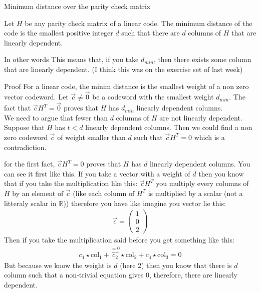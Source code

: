 

\begin{parag}{Minimum distance over the parity check matrix}
	\begin{theoreme}
	     Let $H$ be any parity check matrix of a linear code. The minimum distance of the code is the smallest positive integer $d$ such that there are $d$ columns of $H$ that are linearly dependent.
	\end{theoreme}
	\begin{subparag}{In other words}
	    This means that, if you take $d_{min}$, then there exists some column that are linearly dependent. (I think this was on the exercise set of last week)
	\end{subparag}
	\begin{subparag}{Proof}
	    For a linear code, the minim distance is the smallest weight of a non zero vector codeword. Let $\vec{c} \neq \vec{0}$ be a codeword with the smallest weight $d_{min}$. The fact that $\vec{c}H^T =  \vec{0}$ proves that $H$ has $d_{min}$ linearly dependent columns.\\
	    We need to argue that fewer than $d$ columns of $H$ are not linearly dependent. Suppose that $H$ has $t < d$ linearly dependent columns. Then we could find a non zero codeword $\vec{c}$ of weight smaller than $d$ such that $\vec{c}H^T =  0$ which is a contradiction.

	\end{subparag}
    
	\begin{framedremark}
	  for the first fact, $\vec{c}H^T =  0$ proves that $H$ has $d$ linearly dependent columns. You can see it first like this. If you take a vector with a weight of $d$ then you know that if you take the multiplication like this: $\vec{c}H^T$ you multiply every columns of $H$ by an element of $\vec{c}$ (like each column of $H^T$ is multiplied by a scalar (not a litteraly scalar in $\mathbb{R}$)) therefore you have like imagine you vector lie this:
	  \begin{align*} 
		  \vec{c} =  \begin{pmatrix} 1 \\ 0 \\ 2 \end{pmatrix} 
	  \end{align*}
	  Then if you take the multiplication said before you get something like this:
	  \begin{align*} 
		  c_1 \star  \text{col}_1 + \overbrace{c_2}^{= 0} \star  \text{col}_2 + c_3 \star  \text{col}_3 =  0
	  \end{align*}
	  But because we know the weight is $d$ (here 2) then you know that  there is $d$ column such that a non-trivial equation gives $0$, therefore, there are linearly dependent.
	\end{framedremark}
\end{parag}





